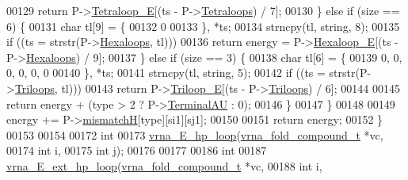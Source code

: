\begin{DoxyCode}
00129         \textcolor{keywordflow}{return} P->\mbox{\hyperlink{group__energy__parameters_a3a853cc7dbad832e377d03c2be09f3a0}{Tetraloop\_E}}[(ts - P->\mbox{\hyperlink{group__energy__parameters_a2fda2f47699f66eb79becc63481dc7a5}{Tetraloops}}) / 7];
00130     \} \textcolor{keywordflow}{else} \textcolor{keywordflow}{if} (size == 6) \{
00131       \textcolor{keywordtype}{char} tl[9] = \{
00132         0
00133       \}, *ts;
00134       strncpy(tl, \textcolor{keywordtype}{string}, 8);
00135       \textcolor{keywordflow}{if} ((ts = strstr(P->\mbox{\hyperlink{group__energy__parameters_a1b32fef887ebf8097da6f5913743794c}{Hexaloops}}, tl)))
00136         \textcolor{keywordflow}{return} energy = P->\mbox{\hyperlink{group__energy__parameters_a9fa7c16fb78efb6e2730b6553282ebf9}{Hexaloop\_E}}[(ts - P->\mbox{\hyperlink{group__energy__parameters_a1b32fef887ebf8097da6f5913743794c}{Hexaloops}}) / 9];
00137     \} \textcolor{keywordflow}{else} \textcolor{keywordflow}{if} (size == 3) \{
00138       \textcolor{keywordtype}{char} tl[6] = \{
00139         0, 0, 0, 0, 0, 0
00140       \}, *ts;
00141       strncpy(tl, \textcolor{keywordtype}{string}, 5);
00142       \textcolor{keywordflow}{if} ((ts = strstr(P->\mbox{\hyperlink{group__energy__parameters_a5824325d79edfe569c6023f52a08d7be}{Triloops}}, tl)))
00143         \textcolor{keywordflow}{return} P->\mbox{\hyperlink{group__energy__parameters_a779303656223c8f9f12a7bdb877ae4ae}{Triloop\_E}}[(ts - P->\mbox{\hyperlink{group__energy__parameters_a5824325d79edfe569c6023f52a08d7be}{Triloops}}) / 6];
00144 
00145       \textcolor{keywordflow}{return} energy + (type > 2 ? P->\mbox{\hyperlink{group__energy__parameters_a0ad35507a03ba7f751e82cb375e991dd}{TerminalAU}} : 0);
00146     \}
00147   \}
00148 
00149   energy += P->\mbox{\hyperlink{group__energy__parameters_ad07794648fa1cac6f02c57c095fb53e6}{mismatchH}}[type][si1][sj1];
00150 
00151   \textcolor{keywordflow}{return} energy;
00152 \}
00153 
00154 
00172 \textcolor{keywordtype}{int}
00173 \mbox{\hyperlink{group__loops_ga999ba163a8148d72fd5f22819a681df7}{vrna\_E\_hp\_loop}}(\mbox{\hyperlink{group__fold__compound_structvrna__fc__s}{vrna\_fold\_compound\_t}} *vc,
00174                \textcolor{keywordtype}{int}                  i,
00175                \textcolor{keywordtype}{int}                  j);
00176 
00177 
00186 \textcolor{keywordtype}{int}
00187 \mbox{\hyperlink{group__loops_gac3393ee309372eccae944e3a07f455f9}{vrna\_E\_ext\_hp\_loop}}(\mbox{\hyperlink{group__fold__compound_structvrna__fc__s}{vrna\_fold\_compound\_t}} *vc,
00188                    \textcolor{keywordtype}{int}                  i,

\end{DoxyCode}
